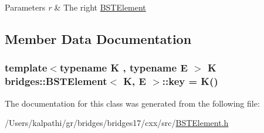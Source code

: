 \begin{DoxyParams}{Parameters}
{\em r} & The right \hyperlink{classbridges_1_1_b_s_t_element}{B\+S\+T\+Element} \\
\hline
\end{DoxyParams}


\subsection{Member Data Documentation}
\hypertarget{classbridges_1_1_b_s_t_element_aebe8a0958484a0e28e777b423079bae2}{}
\subsubsection[{key}]{\setlength{\rightskip}{0pt plus 5cm}template$<$typename K , typename E $>$ K {\bf bridges\+::\+B\+S\+T\+Element}$<$ K, E $>$\+::key = K()\hspace{0.3cm}{\ttfamily [protected]}}\label{classbridges_1_1_b_s_t_element_aebe8a0958484a0e28e777b423079bae2}


The documentation for this class was generated from the following file\+:\begin{DoxyCompactItemize}
\item 
/\+Users/kalpathi/gr/bridges/bridges17/cxx/src/\hyperlink{_b_s_t_element_8h}{B\+S\+T\+Element.\+h}\end{DoxyCompactItemize}
